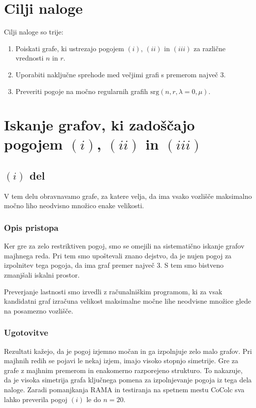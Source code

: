 \documentclass[a4paper,12pt]{article}
\begin{document}
\section{Cilji naloge}
Cilji naloge so trije: 
\begin{enumerate}
    \item Poiskati grafe, ki ustrezajo pogojem $(i)$, $(ii)$ in $(iii)$ za različne vrednosti $n$ in $r$.
    \item Uporabiti naključne sprehode med večjimi grafi s premerom največ 3.
    \item Preveriti pogoje na močno regularnih grafih $\mathrm{srg}(n,r,\lambda = 0,\mu)$.
\end{enumerate}

\section{Iskanje grafov, ki zadoščajo pogojem $(i)$, $(ii)$ in $(iii)$}

\subsection{$(i)$ del}
V tem delu obravnavamo grafe, za katere velja, da ima vsako vozlišče
maksimalno močno liho neodvisno množico enake velikosti.

\subsubsection*{Opis pristopa}

Ker gre za zelo restriktiven pogoj, smo se omejili na sistematično iskanje
grafov majhnega reda. Pri tem smo upoštevali znano dejstvo, da je nujen
pogoj za izpolnitev tega pogoja, da ima graf premer največ $3$.
S tem smo bistveno zmanjšali iskalni prostor.

Preverjanje lastnosti smo izvedli z računalniškim programom, ki za vsak
kandidatni graf izračuna velikost maksimalne močne lihe neodvisne množice
glede na posamezno vozlišče.

\subsubsection*{Ugotovitve}

Rezultati kažejo, da je pogoj izjemno močan in ga izpolnjuje zelo malo grafov.
Pri majhnih redih se pojavi le nekaj izjem, imajo visoko stopnjo simetrije.
Gre za grafe z majhnim premerom in
enakomerno razporejeno strukturo. To nakazuje, da je visoka simetrija grafa ključnega pomena za izpolnjevanje pogoja iz tega dela naloge. Zaradi pomanjkanja RAMA in testiranja na spetnem mestu CoColc sva lahko preverila pogoj $(i)$ le do $n = 20$.
\end{document}
